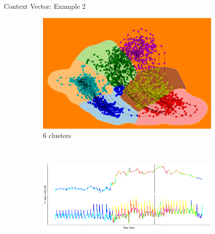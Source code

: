 \documentclass{beamer}
\begin{document}
\begin{frame}[shrink]{Context Vector: Example 2}
\begin{figure}[H]
	\begin{subfigure}[b]{0.35\textwidth}
		\includegraphics[width=\textwidth]{ex2_pca_cluster_6.png}
		\caption{\(6\) clusters}
		\label{fig:ex2_pca_cluster_6}
	\end{subfigure}
	~
	\begin{subfigure}[b]{0.6\textwidth}
		\includegraphics[width=\textwidth]{ex2_context_timeline_6.png}
		\label{fig:ex2_context_timeline_6}
	\end{subfigure}
\end{figure}

\end{frame}
\end{document}
